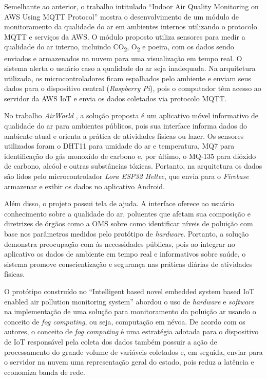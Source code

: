 Semelhante ao anterior, o trabalho intitulado ``Indoor Air Quality Monitoring on AWS Using MQTT Protocol'' \cite{iot-monitoring-on-aws} mostra o desenvolvimento de um módulo de monitoramento da qualidade do ar 
em ambientes internos utilizando o protocolo MQTT e serviços da AWS. O módulo proposto utiliza sensores para medir a qualidade do ar interno, incluindo CO\textsubscript{2}, O\textsubscript{2} e poeira, com os dados sendo enviados e armazenados na 
nuvem para uma visualização em tempo real. O sistema alerta o usuário caso a qualidade do ar seja inadequada. Na arquitetura utilizada, os microcontroladores ficam espalhados 
pelo ambiente e enviam seus dados para o dispositivo central (\textit{Raspberry Pi}), pois o computador têm acesso ao servidor da AWS IoT e envia os dados coletados via protocolo MQTT.

No trabalho \textit{AirWorld} \cite{UFAMAirWorld}, a solução proposta é um aplicativo móvel informativo de qualidade do ar para ambientes públicos, pois 
sua interface informa dados do ambiente atual e orienta a prática de atividades físicas ou lazer. Os sensores utilizados foram o DHT11 para umidade do ar e temperatura, MQ7 para identificação do gás monoxído de 
carbono e, por último, o MQ-135 para dióxido de carbono, alcóol e outras substâncias tóxicas. Portanto, na arquitetura os dados são lidos pelo microcontrolador 
\textit{Lora ESP32 Heltec}, que envia para o \textit{Firebase} armazenar e exibir os dados no aplicativo Android. 

Além disso, o projeto possui tela de ajuda. A interface oferece ao usuário conhecimento sobre a qualidade do ar, poluentes que afetam sua composição e diretrizes de órgãos como a OMS sobre 
como identificar níveis de poluição com base nos parâmetros medidos pelo protótipo de \textit{hardware}. Portanto, a solução demonstra preocupação com às necessidades públicas, pois ao integrar 
no aplicativo os dados de ambiente em tempo real e informativos sobre saúde, o sistema promove conscientização e segurança nas práticas diárias de atividades físicas.

O protótipo construído no ``Intelligent based novel embedded system based IoT enabled air
pollution monitoring system'' \cite{tbRelacionado4NovelEmbeddedSystem} abordou o uso de \textit{hardware} e \textit{software} na implementação 
de uma solução para monitoramento da poluição ar usando o conceito de \textit{fog computing}, ou seja, computação em névoa. De acordo com os autores, o conceito de 
\textit{fog computing} é uma estratégia adotada para o dispositivo de IoT responsável pela coleta dos dados também possuir a ação de processamento do grande volume de variáveis coletados e, 
em seguida, enviar para o servidor na nuvem uma representação geral do estado, pois reduz a latência e economiza banda de rede.

